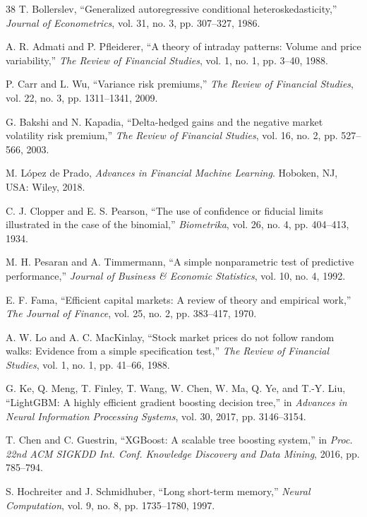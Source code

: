\documentclass[conference]{IEEEtran}
\begin{document}
\begin{thebibliography}{38}
 T. Bollerslev, ``Generalized autoregressive conditional
heteroskedasticity,'' \emph{Journal of Econometrics}, vol. 31, no. 3,
pp. 307--327, 1986.

 A. R. Admati and P. Pfleiderer, ``A theory of intraday
patterns: Volume and price variability,'' \emph{The Review of Financial
Studies}, vol. 1, no. 1, pp. 3--40, 1988.

 P. Carr and L. Wu, ``Variance risk premiums,'' \emph{The
Review of Financial Studies}, vol. 22, no. 3, pp. 1311--1341, 2009.

 G. Bakshi and N. Kapadia, ``Delta-hedged gains and the
negative market volatility risk premium,'' \emph{The Review of Financial
Studies}, vol. 16, no. 2, pp. 527--566, 2003.

 M. L\'opez de Prado, \emph{Advances in Financial Machine
Learning}. Hoboken, NJ, USA: Wiley, 2018.

 C. J. Clopper and E. S. Pearson, ``The use of confidence
or fiducial limits illustrated in the case of the binomial,''
\emph{Biometrika}, vol. 26, no. 4, pp. 404--413, 1934.

 M. H. Pesaran and A. Timmermann, ``A simple nonparametric test
of predictive performance,'' \emph{Journal of Business \& Economic Statistics},
vol. 10, no. 4, 1992.

 E. F. Fama, ``Efficient capital markets: A review of theory
and empirical work,'' \emph{The Journal of Finance}, vol. 25, no. 2,
pp. 383--417, 1970.

 A. W. Lo and A. C. MacKinlay, ``Stock market prices do not
follow random walks: Evidence from a simple specification test,'' \emph{The
Review of Financial Studies}, vol. 1, no. 1, pp. 41--66, 1988.

 G. Ke, Q. Meng, T. Finley, T. Wang, W. Chen, W. Ma, Q. Ye, and
T.-Y. Liu, ``LightGBM: A highly efficient gradient boosting decision tree,'' in
\emph{Advances in Neural Information Processing Systems}, vol. 30, 2017,
pp. 3146--3154.

 T. Chen and C. Guestrin, ``XGBoost: A scalable tree boosting
system,'' in \emph{Proc. 22nd ACM SIGKDD Int. Conf. Knowledge Discovery and
Data Mining}, 2016, pp. 785--794.

 S. Hochreiter and J. Schmidhuber, ``Long short-term
memory,'' \emph{Neural Computation}, vol. 9, no. 8, pp. 1735--1780, 1997.


\end{thebibliography}
\end{document}
